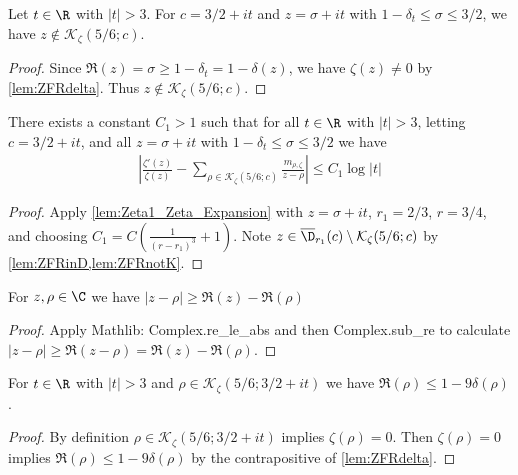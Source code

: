 \begin{lemma} \label{lem:ZFRnotK}  \leanok
Let $t\in\R$ with $|t|>3$. For $c=3/2+it$ and $z=\sigma+it$ with $1-\delta_t \le \sigma \le 3/2$, we have $z\notin \mathcal K_{\zeta}(5/6;c)$.
\end{lemma}
\begin{proof}
\leanok
Since $\Re(z) = \sigma \ge 1-\delta_t = 1 - \delta(z)$, we have $\zeta(z)\neq0$ by \cref{lem:ZFRdelta}. Thus $z\notin \mathcal K_{\zeta}(5/6;c)$.
\end{proof}

\begin{lemma}[Expansion]\label{lem:Zeta_Expansion_ZFR}  \leanok
There exists a constant $C_1>1$ such that for all $t\in\R$ with $|t|>3$, letting $c=3/2+it$, and all $z=\sigma+it$ with $1-\delta_t \le \sigma \le 3/2$ we have
\begin{align*}
\left|\frac{\zeta'(z)}{\zeta(z)} - \sum_{\rho\in\mathcal K_{\zeta}(5/6;c)} \frac{m_{\rho,\zeta}}{z-\rho} \right| \le C_1\log|t|
\end{align*}
\end{lemma}
\begin{proof}
 \leanok
Apply \cref{lem:Zeta1_Zeta_Expansion} with $z=\sigma+it$, $r_1 = 2/3$, $r = 3/4$, and choosing $C_1 = C\left(\frac{1}{(r-r_1)^3} + 1\right)$.
Note $z\in\overline{\D}_{r_1}(c)\setminus \mathcal K_\zeta(5/6;c)$ by \cref{lem:ZFRinD,lem:ZFRnotK}.
\end{proof}

\begin{lemma} \label{lem:abszrhoReRe}  \leanok
For $z,\rho\in\C$ we have $|z-\rho| \ge \Re(z) - \Re(\rho)$
\end{lemma}
\begin{proof}
\leanok
Apply Mathlib: Complex.re\_le\_abs and then Complex.sub\_re
to calculate $|z-\rho| \ge \Re(z-\rho) = \Re(z) - \Re(\rho)$.
\end{proof}

\begin{lemma} \label{lem:Rerhotodeltarho}  \leanok
For $t\in \R$ with $|t|>3$ and $\rho\in\mathcal K_{\zeta}(5/6;3/2+it)$ we have $\Re(\rho) \le 1 - 9\delta(\rho)$.
\end{lemma}
\begin{proof}
\leanok
By definition $\rho\in\mathcal K_{\zeta}(5/6;3/2+it)$ implies $\zeta(\rho)=0$. Then $\zeta(\rho)=0$ implies $\Re(\rho) \le 1 - 9\delta(\rho)$ by the contrapositive of \cref{lem:ZFRdelta}.
\end{proof}

